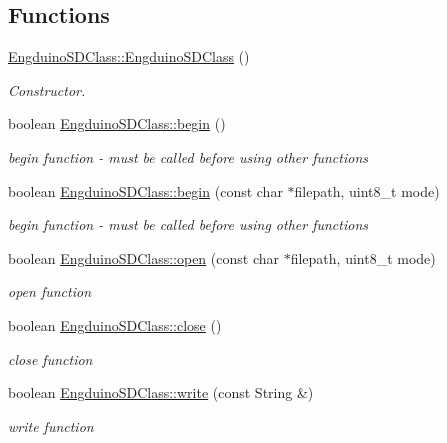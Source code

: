 \subsection*{Functions}
\begin{DoxyCompactItemize}
\item 
\hyperlink{group___engduino_s_d_ga3f1f4d4ab1f7d9266d293ebd485ec02a}{Engduino\+S\+D\+Class\+::\+Engduino\+S\+D\+Class} ()
\begin{DoxyCompactList}\small\item\em Constructor. \end{DoxyCompactList}\item 
boolean \hyperlink{group___engduino_s_d_ga5e6b57dac1ab9ba6de542adf0866d049}{Engduino\+S\+D\+Class\+::begin} ()
\begin{DoxyCompactList}\small\item\em begin function -\/ must be called before using other functions \end{DoxyCompactList}\item 
boolean \hyperlink{group___engduino_s_d_ga2ef82f0b803d5f71436becb8f9a0e162}{Engduino\+S\+D\+Class\+::begin} (const char $\ast$filepath, uint8\+\_\+t mode)
\begin{DoxyCompactList}\small\item\em begin function -\/ must be called before using other functions \end{DoxyCompactList}\item 
boolean \hyperlink{group___engduino_s_d_ga2a5732a0ca8a4d67eb8584377eff03aa}{Engduino\+S\+D\+Class\+::open} (const char $\ast$filepath, uint8\+\_\+t mode)
\begin{DoxyCompactList}\small\item\em open function \end{DoxyCompactList}\item 
boolean \hyperlink{group___engduino_s_d_ga5955e04f63806f0ea11c9b754a62e8fc}{Engduino\+S\+D\+Class\+::close} ()
\begin{DoxyCompactList}\small\item\em close function \end{DoxyCompactList}\item 
boolean \hyperlink{group___engduino_s_d_ga609219465a1d1799c634dd30f4d85d4d}{Engduino\+S\+D\+Class\+::write} (const String \&)
\begin{DoxyCompactList}\small\item\em write function \end{DoxyCompactList}\item 

\end{DoxyCompactItemize}
